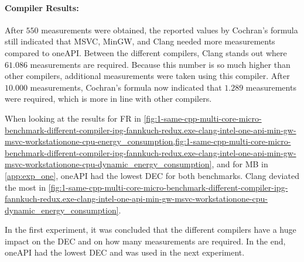 \paragraph{Compiler Results:} After $550$ measurements were obtained, the reported values by Cochran's formula still indicated that MSVC, MinGW, and Clang needed more measurements compared to oneAPI. Between the different compilers, Clang stands out where $61.086$ measurements are required. Because this number is so much higher than other compilers, additional measurements were taken using this compiler. After $10.000$ measurements, Cochran's formula now indicated that $1.289$ measurements were required, which is more in line with other compilers.


When looking at the results for FR in \cref{fig:1-same-cpp-multi-core-micro-benchmark-different-compiler-ipg-fannkuch-redux.exe-clang-intel-one-api-min-gw-msvc-workstationone-cpu-energy_consumption,fig:1-same-cpp-multi-core-micro-benchmark-different-compiler-ipg-fannkuch-redux.exe-clang-intel-one-api-min-gw-msvc-workstationone-cpu-dynamic_energy_consumption}, and for MB in \cref{app:exp_one}, oneAPI had the lowest DEC for both benchmarks. Clang deviated the most in \cref{fig:1-same-cpp-multi-core-micro-benchmark-different-compiler-ipg-fannkuch-redux.exe-clang-intel-one-api-min-gw-msvc-workstationone-cpu-dynamic_energy_consumption}.

In the first experiment, it was concluded that the different compilers have a huge impact on the DEC and on how many measurements are required. In the end, oneAPI had the lowest DEC and was used in the next experiment.

